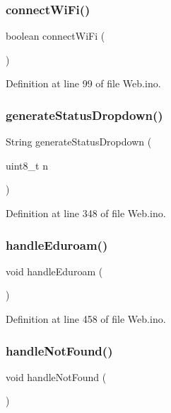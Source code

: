\subsubsection{\texorpdfstring{connectWiFi()}{connectWiFi()}}
{\footnotesize\ttfamily boolean connect\+Wi\+Fi (\begin{DoxyParamCaption}{ }\end{DoxyParamCaption})}



Definition at line 99 of file Web.\+ino.

\mbox{\label{_web_8ino_a63f74e7b8412cefe754f74c174c0d024}} 
\subsubsection{\texorpdfstring{generateStatusDropdown()}{generateStatusDropdown()}}
{\footnotesize\ttfamily String generate\+Status\+Dropdown (\begin{DoxyParamCaption}\item[{uint8\+\_\+t}]{n }\end{DoxyParamCaption})}



Definition at line 348 of file Web.\+ino.

\mbox{\label{_web_8ino_ac6b09eb8896b2e7975b32c3b4c82387b}} 
\subsubsection{\texorpdfstring{handleEduroam()}{handleEduroam()}}
{\footnotesize\ttfamily void handle\+Eduroam (\begin{DoxyParamCaption}{ }\end{DoxyParamCaption})}



Definition at line 458 of file Web.\+ino.

\mbox{\label{_web_8ino_a54f2b176a577c7a89bb94da4f12cd06b}} 
\subsubsection{\texorpdfstring{handleNotFound()}{handleNotFound()}}
{\footnotesize\ttfamily void handle\+Not\+Found (\begin{DoxyParamCaption}{ }\end{DoxyParamCaption})}



